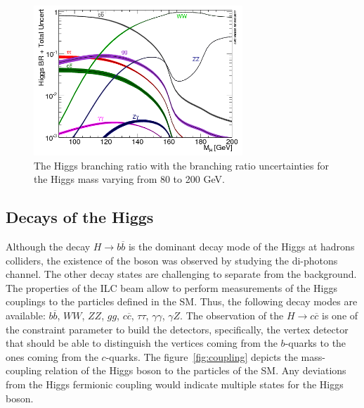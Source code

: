     \begin{figure}[!h]
      \centering
      \includegraphics[width = 0.7\textwidth]{Pictures/Higgs/BRTotalUncertBands_lm.png}
      \caption{The Higgs branching ratio with the branching ratio uncertainties for the Higgs mass varying from 80 to 200 GeV\cite{Denner:2011mq}.}
      \label{fig:higgsProd}
    \end{figure}

    \subsection{Decays of the Higgs}
    
    Although the decay $H \rightarrow b\overline{b}$ is the dominant decay mode of the Higgs at hadrons colliders, the existence of the boson was observed by studying the di-photons channel.
    The other decay states are challenging to separate from the background.
    The properties of the \gls{ILC} beam allow to perform measurements of the Higgs couplings to the particles defined in the \gls{SM}.
    Thus, the following decay modes are available: $b\overline{b}$, $WW$, $ZZ$, $gg$, $c\overline{c}$, $\tau \tau$, $\gamma \gamma$, $\gamma Z$.
    The observation of the $H \rightarrow c\overline{c}$ is one of the constraint parameter to build the detectors, specifically, the vertex detector that should be able to distinguish the vertices coming from the $b$-quarks to the ones coming from the $c$-quarks.
    The figure~\ref{fig:coupling} depicts the mass-coupling relation of the Higgs boson to the particles of the \gls{SM}.
    Any deviations from the Higgs fermionic coupling would indicate multiple states for the Higgs boson.

